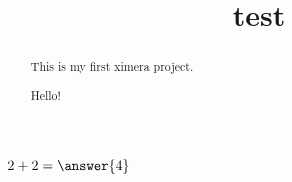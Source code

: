 \documentclass{ximera}
\title{test}
\begin{document}
\begin{abstract}

This is my first ximera project.

Hello!


\end{abstract}
\maketitle
$2 + 2 =\answer{4}$
\end{document}
